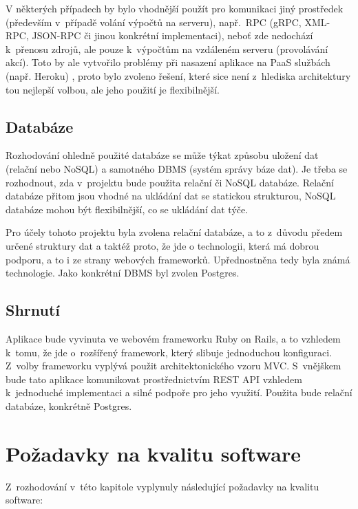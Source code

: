 \documentclass[twoside]{ctuthesis}
\begin{document}
V některých případech by bylo vhodnější použít pro komunikaci jiný prostředek (především v~případě volání výpočtů na serveru), např.~RPC (gRPC, XML-RPC, JSON-RPC či jinou konkrétní implementaci), neboť zde nedochází k~přenosu zdrojů, ale pouze k~výpočtům na vzdáleném serveru (provolávání akcí). \cite{sturgeon2016understanding} Toto by ale vytvořilo problémy při nasazení aplikace na PaaS službách (např. Heroku) \cite{lisitsky2018does}, proto bylo zvoleno řešení, které sice není z~hlediska architektury tou nejlepší volbou, ale jeho  použití je flexibilnější.

\subsection{Databáze}

Rozhodování ohledně použité databáze se může týkat způsobu uložení dat (relační nebo NoSQL) a samotného DBMS (systém správy báze dat). Je třeba se rozhodnout, zda v~projektu bude použita relační či NoSQL databáze. Relační databáze přitom jsou vhodné na ukládání dat se statickou strukturou, NoSQL databáze mohou být flexibilnější, co se ukládání dat týče.  \cite{geeks2020difference}

Pro účely tohoto projektu byla zvolena relační databáze, a to z~důvodu předem určené struktury dat a taktéž proto, že jde o technologii, která má dobrou podporu, a to i ze strany webových frameworků. Upřednostněna tedy byla známá technologie. Jako konkrétní DBMS byl zvolen Postgres.


\subsection{Shrnutí}

Aplikace bude vyvinuta ve webovém frameworku Ruby on Rails, a to vzhledem k~tomu, že jde o~rozšířený framework, který slibuje jednoduchou konfiguraci. Z~volby frameworku vyplývá použit architektonického vzoru MVC. S~vnějškem bude tato aplikace komunikovat prostřednictvím REST API vzhledem k~jednoduché implementaci a silné podpoře pro jeho využití. Použita bude relační databáze, konkrétně Postgres.

\section{Požadavky na kvalitu software}

Z~rozhodování v~této kapitole vyplynuly následující požadavky na kvalitu software:
\end{document}

